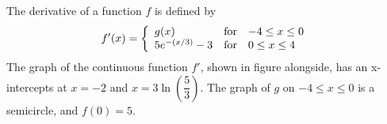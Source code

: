 
%
%
%
%
% 
% 

\question The derivative of a function $f$ is defined by 
\begin{align}
  f'(x) = \left\{
            \begin{array}{l l l}
              g(x)           & \text{for} & -4 \leq x \leq 0 \\
              5 e^{-(x/3)}-3 & \text{for} & 0 \leq x \leq 4  \\
            \end{array} 
          \right. \nonumber 
\end{align}
The graph of the continuous function $f'$, shown in figure alongside, has an x-intercepts at $x=-2$ and $x=3\ln (\dfrac{5}{3})$. The graph of $g$ on $-4 \leq x \leq 0$ is a semicircle, and $f(0)=5$.

